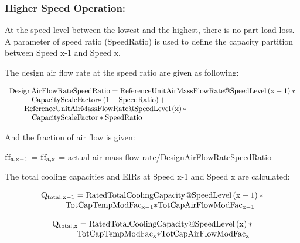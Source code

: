 \subsubsection{Higher Speed Operation:}\label{higher-speed-operation-1-000}

At the speed level between the lowest and the highest, there is no part-load loss. A parameter of speed ratio (SpeedRatio) is used to define the capacity partition between Speed x-1 and Speed x.

The design air flow rate at the speed ratio are given as following:

\begin{equation}
  \begin{array}{l}
    \rm{DesignAirFlowRateSpeedRatio} = \rm{ReferenceUnitAirMassFlowRate} @ \rm{SpeedLevel} \left( \rm{x} - 1 \right) \rm{*} \\
    \quad \quad \quad \rm{CapacityScaleFactor*} \left( 1 - \rm{SpeedRatio} \right) + \\
    \quad \quad \rm{ReferenceUnitAirMassFlowRate} @ \rm{SpeedLevel} \left( \rm{x} \right) \rm{*} \\
    \quad \quad \quad \rm{CapacityScaleFactor*SpeedRatio}
  \end{array}
\end{equation}

And the fraction of air flow is given:

\({\rm{f}}{{\rm{f}}_{{\rm{a}},{\rm{x}} - 1}}\) = \({\rm{f}}{{\rm{f}}_{{\rm{a}},{\rm{x}}}}\) = actual air mass flow rate/DesignAirFlowRateSpeedRatio

The total cooling capacities and EIRs at Speed x-1 and Speed x are calculated:

\begin{equation}
  \begin{array}{l}
    \rm{Q}_{\rm{total},\rm{x} - 1} = \rm{RatedTotalCoolingCapacity} @ \rm{SpeedLevel} \left( \rm{x} - 1 \right) \rm{*} \\
    \quad \quad \quad \rm{TotCapTempModFa} \rm{c}_{\rm{x} - 1} \rm{*TotCapAirFlowModFa} \rm{c}_{\rm{x} - 1}
  \end{array}
\end{equation}

\begin{equation}
  \begin{array}{l}
    \rm{Q}_{\rm{total},\rm{x}} = \rm{RatedTotalCoolingCapacity} @ \rm{SpeedLevel} \left( \rm{x} \right) \rm{*} \\
    \quad \quad \quad \rm{TotCapTempModFa} \rm{c}_{\rm{x}} \rm{*TotCapAirFlowModFa} \rm{c}_{\rm{x}}
  \end{array}
\end{equation}

